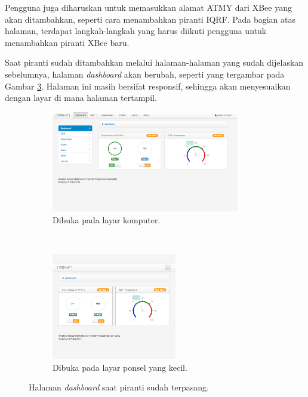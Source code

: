 			Pengguna juga diharuskan untuk memasukkan alamat ATMY dari XBee yang akan ditambahkan, seperti cara menambahkan piranti IQRF. Pada bagian atas halaman, terdapat langkah-langkah yang harus diikuti pengguna untuk menambahkan piranti XBee baru.

			Saat piranti sudah ditambahkan melalui halaman-halaman yang sudah dijelaskan sebelumnya, halaman \emph{dashboard} akan berubah, seperti yang tergambar pada Gambar \ref{dashboard-full-device}. Halaman ini masih bersifat responsif, sehingga akan menyesuaikan dengan layar di mana halaman tertampil.

				\begin{figure}[H]
				  \begin{subfigure}[b]{\textwidth}
				  \centering
				    \includegraphics[width=0.9\textwidth]{gambar/dashboard-full}
				    \caption{Dibuka pada layar komputer.}
				    \label{dashboard-full}
				  \end{subfigure}
				~
				  \begin{subfigure}[b]{\textwidth}
				  \centering
				    \includegraphics[width=0.6\textwidth]{gambar/dashboard-full-small}
				    \caption{Dibuka pada layar ponsel yang kecil.}
				    \label{dashboard-full-small}
				  \end{subfigure}
				  \caption{Halaman \emph{dashboard} saat piranti sudah terpasang.}
				  \label{dashboard-full-device}
				\end{figure}

